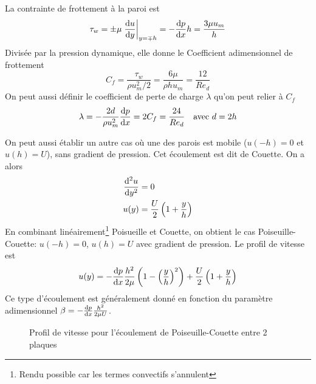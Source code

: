 \documentclass[a4paper,11pt]{report}
\begin{document}
        La contrainte de frottement à la paroi est
        \begin{equation}
          \tau_w = \pm \mu \eval{\dv{u}{y}}_{y=\mp h} = -\dv{p}{x} h = \frac{3\mu u_m}{h}
        \end{equation}
        Divisée par la pression dynamique, elle donne le Coefficient adimensionnel de frottement
        \begin{equation}
          C_f = \frac{\tau_w}{\rho u_m^2/2} = \frac{6\mu}{\rho h u_m} = \frac{12}{Re_d}
        \end{equation}
        On peut aussi définir le coefficient de perte de charge $\lambda$ qu'on peut relier à $C_f$
        \begin{equation}
          \lambda = -\frac{2d}{\rho u_m^2}\dv{p}{x} = 2 C_f = \frac{24}{Re_d} \quad \textrm{avec } d = 2h
        \end{equation}

        On peut aussi établir un autre cas où une des parois est mobile ($u(-h) = 0$ et $u(h) = U$), sans gradient de pression. Cet écoulement est dit de Couette. On a alors
        \begin{equation}
          \begin{aligned}
            \dv[2]{u}{y} &= 0\\
            u(y) &= \frac{U}{2} \left(1 + \frac{y}{h} \right)
          \end{aligned}
        \end{equation}
        En combinant linéairement\footnote{Rendu possible car les termes convectifs s'annulent} Poisueille et Couette, on obtient le cas Poiseuille-Couette: $u(-h)=0$, $u(h)=U$ avec gradient de pression. Le profil de vitesse est
        \begin{equation}
          u(y) = -\dv{p}{x} \frac{h^2}{2\mu} \left(1-\left(\frac{y}{h}\right)^2\right) + \frac{U}{2}\left(1+\frac{y}{h}\right)
        \end{equation}
        Ce type d'écoulement est généralement donné en fonction du paramètre adimensionnel $\beta = -\dv{p}{x} \frac{h^2}{2\mu U}$.
        \begin{figure}[h]
          \centering
          
          \caption{Profil de vitesse pour l'écoulement de Poiseuille-Couette entre 2 plaques}
        \end{figure}
\end{document}
